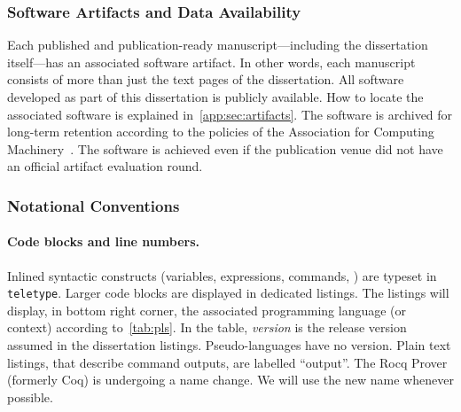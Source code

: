 \subsubsection{Software Artifacts and Data Availability}

Each published and publication-ready manuscript---including the dissertation
itself---has an associated software artifact. In other words, each manuscript
consists of more than just the text pages of the dissertation. All software
developed as part of this dissertation is publicly available. How to locate the
associated software is explained in~\autoref{app:sec:artifacts}. The software is
archived for long-term retention according to the policies of the Association
for Computing Machinery~\cite{acm_badging}. The software is achieved even if the
publication venue did not have an official artifact evaluation round.

\subsubsection{Notational Conventions}

\paragraph*{Code blocks and line numbers.}
Inlined syntactic constructs (variables, expressions, commands, \etc) are
typeset in \texttt{teletype}. Larger code blocks are displayed in dedicated
listings. The listings will display, in bottom right corner, the associated
programming language (or context) according to~\autoref{tab:pls}. In the table,
\emph{version} is the release version assumed in the dissertation listings.
Pseudo-languages have no version. Plain text listings, that describe command
outputs, are labelled \enquote{output}. The Rocq Prover (formerly Coq) is
undergoing a name change. We will use the new name whenever possible.

